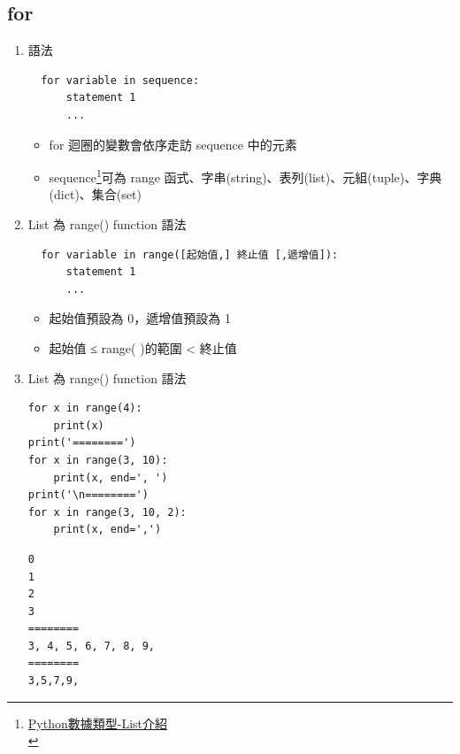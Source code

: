 \documentclass[a4paper,12pt]{article}
\begin{document}
\subsection{for}
\label{sec:org6b492b0}
\begin{enumerate}
\item 語法
\label{sec:orgdd362eb}
\lstset{breaklines=true,language=Python,label= ,caption= ,captionpos=b,firstnumber=1,numbers=left}
\begin{lstlisting}
  for variable in sequence:
      statement 1
      ...
\end{lstlisting}
\begin{itemize}
\item for 迴圈的變數會依序走訪 sequence 中的元素\\
\item sequence\footnote{\href{http://liyangbit.com/tutorials/python-list/}{Python數據類型-List介紹}\\}可為 range 函式、字串(string)、表列(list)、元組(tuple)、字典(dict)、集合(set)\\
\end{itemize}

\item List 為 range() function 語法
\label{sec:orgd03e5ac}
\lstset{breaklines=true,language=Python,label= ,caption= ,captionpos=b,numbers=none}
\begin{lstlisting}
  for variable in range([起始值,] 終止值 [,遞增值]):
      statement 1
      ...
\end{lstlisting}
\begin{itemize}
\item 起始值預設為 0，遞增值預設為 1\\
\item 起始值 ≤ range( )的範圍 < 終止值\\
\end{itemize}

\item List 為 range() function 語法
\label{sec:orgeddfad3}
\lstset{breaklines=true,language=Python,label= ,caption= ,captionpos=b,firstnumber=1,numbers=left}
\begin{lstlisting}
for x in range(4):
    print(x)
print('========')
for x in range(3, 10):
    print(x, end=', ')
print('\n========')
for x in range(3, 10, 2):
    print(x, end=',')
\end{lstlisting}

\begin{verbatim}
0
1
2
3
========
3, 4, 5, 6, 7, 8, 9,
========
3,5,7,9,
\end{verbatim}


\end{enumerate}
\end{document}
